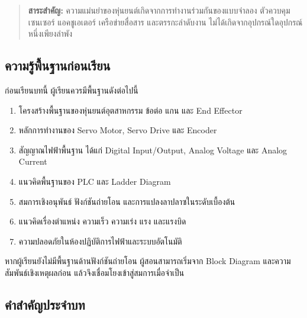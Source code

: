 \begin{quote}
\textbf{สาระสำคัญ:} ความแม่นยำของหุ่นยนต์เกิดจากการทำงานร่วมกันของแบบจำลอง ตัวควบคุม เซนเซอร์ แอคชูเอเตอร์ เครือข่ายสื่อสาร และตรรกะลำดับงาน ไม่ได้เกิดจากอุปกรณ์ใดอุปกรณ์หนึ่งเพียงลำพัง
\end{quote}

\subsection{ความรู้พื้นฐานก่อนเรียน}

ก่อนเรียนบทนี้ ผู้เรียนควรมีพื้นฐานดังต่อไปนี้

\begin{enumerate}
    \item โครงสร้างพื้นฐานของหุ่นยนต์อุตสาหกรรม ข้อต่อ แกน และ End Effector
    \item หลักการทำงานของ Servo Motor, Servo Drive และ Encoder
    \item สัญญาณไฟฟ้าพื้นฐาน ได้แก่ Digital Input/Output, Analog Voltage และ Analog Current
    \item แนวคิดพื้นฐานของ PLC และ Ladder Diagram
    \item สมการเชิงอนุพันธ์ ฟังก์ชันถ่ายโอน และการแปลงลาปลาซในระดับเบื้องต้น
    \item แนวคิดเรื่องตำแหน่ง ความเร็ว ความเร่ง แรง และแรงบิด
    \item ความปลอดภัยในห้องปฏิบัติการไฟฟ้าและระบบอัตโนมัติ
\end{enumerate}

หากผู้เรียนยังไม่มีพื้นฐานด้านฟังก์ชันถ่ายโอน ผู้สอนสามารถเริ่มจาก Block Diagram และความสัมพันธ์เชิงเหตุผลก่อน แล้วจึงเชื่อมโยงเข้าสู่สมการเมื่อจำเป็น

\newpage

\subsection{คำสำคัญประจำบท}


